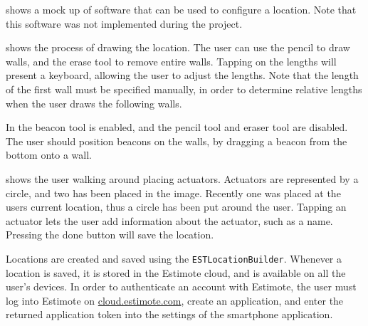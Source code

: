  shows a mock up of software that can be used to configure a location. 
Note that this software was not implemented during the project. 

 shows the process of drawing the location. 
The user can use the pencil to draw walls, 
and the erase tool to remove entire walls. 
Tapping on the lengths will present a keyboard, 
allowing the user to adjust the lengths. 
Note that the length of the first wall must be specified manually, 
in order to determine relative lengths when the user draws the following walls.

In  the beacon tool is enabled, 
and the pencil tool and eraser tool are disabled. 
The user should position beacons on the walls, 
by dragging a beacon from the bottom onto a wall.

 shows the user walking around placing actuators. 
Actuators are represented by a circle, 
and two has been placed in the image. 
Recently one was placed at the users current location, 
thus a circle has been put around the user. 
Tapping an actuator lets the user add information about the actuator, such as a name. 
Pressing the done button will save the location.

Locations are created and saved using the \texttt{ESTLocationBuilder}. 
Whenever a location is saved, 
it is stored in the Estimote cloud, 
and is available on all the user's devices. 
In order to authenticate an account with Estimote, 
the user must log into Estimote on \url{cloud.estimote.com}, 
create an application, 
and enter the returned application token into the settings of the smartphone application.

